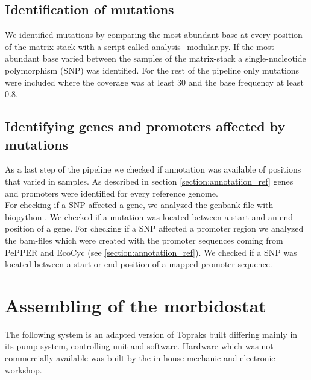 \subsection{Identification of mutations} 
We identified mutations by comparing the most abundant base at every position of the matrix-stack with a script called \href{https://github.com/nahanoo/ESBL\_project/pileup.py}{analysis\_modular.py}. If the most abundant base varied between the samples of the matrix-stack a single-nucleotide polymorphism (SNP) was identified. For the rest of the pipeline only mutations were included where the coverage was at least 30 and the base frequency at least 0.8.

\subsection{Identifying genes and promoters affected by mutations}
As a last step of the pipeline we checked if annotation was available of positions that varied in samples. As described in section \ref{section:annotatiion_ref} genes and promoters were identified for every reference genome. \\
For checking if a SNP affected a gene, we analyzed the genbank file with biopython \cite{cock_biopython:_2009}. We checked if a mutation was located between a start and an end position of a gene. For checking if a SNP affected a promoter region we analyzed the bam-files which were created with the promoter sequences coming from PePPER and EcoCyc (see \ref{section:annotatiion_ref}). We checked if a SNP was located between a start or end position of a mapped promoter sequence. 
\section{Assembling of the morbidostat}
The following system is an adapted version of Topraks built differing mainly in its pump system, controlling unit and software. Hardware which was not commercially available was built by the in-house mechanic and electronic workshop.

